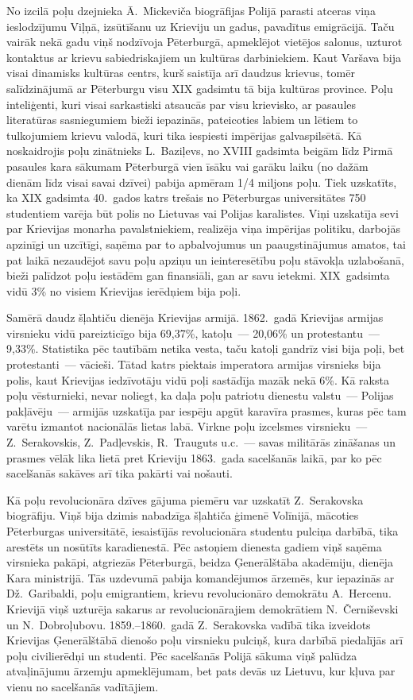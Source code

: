 \documentclass[twoside,a5paper,12pt,fleqn,openany]{extbook}
\begin{document}
No izcilā poļu dzejnieka Ā.~Mickeviča biogrāfijas Polijā parasti atceras viņa ieslodzījumu Viļņā, izsūtīšanu uz Krieviju un gadus, pavadītus emigrācijā. Taču vairāk nekā gadu viņš nodzīvoja Pēterburgā, apmeklējot vietējos salonus, uzturot kontaktus ar krievu sabiedriskajiem un kultūras darbiniekiem. Kaut Varšava bija visai dinamisks kultūras centrs, kurš saistīja arī daudzus krievus, tomēr salīdzinājumā ar Pēterburgu visu XIX gadsimtu tā bija kultūras province. Poļu inteliģenti, kuri visai sarkastiski atsaucās par visu krievisko, ar pasaules literatūras sasniegumiem bieži iepazinās, pateicoties labiem un lētiem to tulkojumiem krievu valodā, kuri tika iespiesti impērijas galvaspilsētā. Kā noskaidrojis poļu zinātnieks L.~Baziļevs, no XVIII gadsimta beigām līdz Pirmā pasaules kara sākumam Pēterburgā vien īsāku vai garāku laiku (no dažām dienām līdz visai savai dzīvei) pabija apmēram 1/4 miljons poļu. Tiek uzskatīts, ka XIX gadsimta 40.~gados katrs trešais no Pēterburgas universitātes 750 studentiem varēja būt polis no Lietuvas vai Polijas karalistes. Viņi uzskatīja sevi par Krievijas monarha pavalstniekiem, realizēja viņa impērijas politiku, darbojās apzinīgi un uzcītīgi, saņēma par to apbalvojumus un paaugstinājumus amatos, tai pat laikā nezaudējot savu poļu apziņu un ieinteresētību poļu stāvokļa uzlabošanā, bieži palīdzot poļu iestādēm gan finansiāli, gan ar savu ietekmi. XIX~gadsimta vidū 3\% no visiem Krievijas ierēdņiem bija poļi.

Samērā daudz šļahtiču dienēja Krievijas armijā. 1862.~gadā Krievijas armijas virsnieku vidū pareizticīgo bija 69,37\%, katoļu~--- 20,06\% un protestantu~--- 9,33\%. Statistika pēc tautībām netika vesta, taču katoļi gandrīz visi bija poļi, bet protestanti~--- vācieši. Tātad katrs piektais imperatora armijas virsnieks bija polis, kaut Krievijas iedzīvotāju vidū poļi sastādīja mazāk nekā 6\%. Kā raksta poļu vēsturnieki, nevar noliegt, ka daļa poļu patriotu dienestu valstu~--- Polijas pakļāvēju~--- armijās uzskatīja par iespēju apgūt karavīra prasmes, kuras pēc tam varētu izmantot nacionālās lietas labā. Virkne poļu izcelsmes virsnieku~--- Z.~Serakovskis, Z.~Padļevskis, R.~Trauguts u.c.~--- savas militārās zināšanas un prasmes vēlāk lika lietā pret Krieviju 1863.~gada sacelšanās laikā, par ko pēc sacelšanās sakāves arī tika pakārti vai nošauti.

Kā poļu revolucionāra dzīves gājuma piemēru var uzskatīt Z.~Serakovska biogrāfiju. Viņš bija dzimis nabadzīga šļahtiča ģimenē Volīnijā, mācoties Pēterburgas universitātē, iesaistījās revolucionāra studentu pulciņa darbībā, tika arestēts un nosūtīts karadienestā. Pēc astoņiem dienesta gadiem viņš saņēma virsnieka pakāpi, atgriezās Pēterburgā, beidza Ģenerālštāba akadēmiju, dienēja Kara ministrijā. Tās uzdevumā pabija komandējumos ārzemēs, kur iepazinās ar Dž.~Garibaldi, poļu emigrantiem, krievu revolucionāro demokrātu A.~Hercenu. Krievijā viņš uzturēja sakarus ar revolucionārajiem demokrātiem N.~Černiševski un N.~Dobroļubovu. 1859.--1860.~gadā Z.~Serakovska vadībā tika izveidots Krievijas Ģenerālštābā dienošo poļu virsnieku pulciņš, kura darbībā piedalījās arī poļu civilierēdņi un studenti. Pēc sacelšanās Polijā sākuma viņš palūdza atvaļinājumu ārzemju apmeklējumam, bet pats devās uz Lietuvu, kur kļuva par vienu no sacelšanās vadītājiem.
\end{document}
